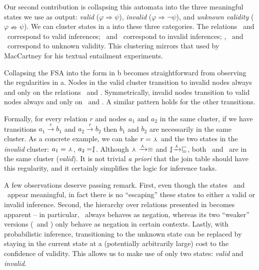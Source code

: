 Our second contribution is collapsing this automata into the three
  meaningful states we use as output: 
    \textit{valid} ($\varphi \Rightarrow \psi$),
    \textit{invalid} ($\varphi \Rightarrow \lnot \psi$),
  and \textit{unknown validity} ($\varphi \nRightarrow \psi$).
We can cluster states in a into these three categories.
The relations \equivalent\ and \forward\ correspond to valid inferences;
  \negate\ and \alternate\ correspond to invalid inferences;
  \reverse, \cover\ and \independent\ correspond to unknown validity.
This clustering mirrors that used by MacCartney for his textual
  entailment experiments.

Collapsing the FSA into the form in b becomes straightforward
  from observing the regularities in a.
Nodes in the valid cluster transition to invalid nodes
  always and only on the relations \negate\ and \alternate.
Symmetrically, invalid nodes transition to valid nodes always and only
  on \negate\ and \cover.
A similar pattern holds for the other transitions.

Formally, for every relation $r$ and nodes $a_1$ and $a_2$ in
  the same cluster, if we have transitions 
  $a_1 \xrightarrow{r} b_1$ and $a_2 \xrightarrow{r} b_2$
  then $b_1$ and $b_2$ are necessarily in the same cluster.
As a concrete example, we can take $r = \curlywedge$ and
  the two states in the \textit{invalid} cluster:
  $a_1 = \curlywedge$, $a_2 = \downharpoonleft\hspace{-1.25mm}\upharpoonright$.
Although $\curlywedge \xrightarrow{\curlywedge} \equiv$ and
  $\downharpoonleft\hspace{-1.25mm}\upharpoonright \xrightarrow{\curlywedge} \sqsubseteq$, both
  \equivalent\ and \forward\ are in the same cluster (\textit{valid}).
It is not trivial \textit{a priori} that the join table should have
  this regularity, and it certainly simplifies the logic for
  inference tasks.

A few observations deserve passing remark.
First, even though the
  states \reverse\ and \cover\ appear meaningful, in fact there is no
  ``escaping'' these states to either a valid or invalid
  inference.
Second, the hierarchy over relations presented in
   becomes apparent -- in particular,
  \negate\ always behaves as negation, whereas its two ``weaker''
  versions (\alternate\ and \cover) only behave as negation in certain
  contexts.
Lastly, with probabilistic inference,
  transitioning to the unknown state can be replaced by staying in the
  current state at a (potentially arbitrarily large) cost to the 
  confidence of validity.
This allows us to make use of only two states:
  \textit{valid} and \textit{invalid}.

